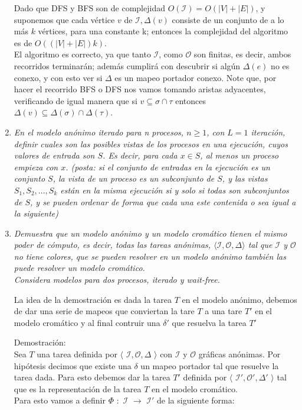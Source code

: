 \documentclass{article}
\begin{document}
\begin{enumerate}
{    Dado que DFS y BFS son de complejidad $O(\mathcal{I}) = O(|V| + |E|)$, y suponemos que cada vértice $v$ de $\mathcal{I},\Delta(v)$
    consiste de un conjunto de a lo más $k$ vértices, para una constante k; entonces la complejidad del algoritmo es de
    $O((|V| + |E|) k)$.\\
    El algoritmo es correcto, ya que tanto $\mathcal{I}$, como $\mathcal{O}$ son finitas, es decir, ambos recorridos terminarán; además
    cumplirá con descubrir si algún $\Delta(e)$ no es conexo, y con esto ver si $\Delta$ es un mapeo portador conexo. Note que, por
    hacer el recorrido BFS o DFS nos vamos tomando aristas adyacentes, verificando de igual manera que si $v\subseteq\sigma\cap\tau$ entonces
    $\Delta(v)\subseteq\Delta(\sigma)\cap\Delta(\tau)$.
  }

\item {
    \textsl{
      En el modelo anónimo iterado para n procesos, $n ≥ 1$, con $L = 1$ iteración, definir
      cuales son las posibles vistas de los procesos en una ejecución, cuyos valores de entrada
      son $S$. Es decir, para cada $x \in S$, al menos un proceso empieza con $x$. (posta: si el
      conjunto de entradas en la ejecución es un conjunto $S$, la vista de un proceso es un 
      subconjunto de $S$, y las vistas $S_1,S_2,...,S_k$ están en la misma ejecución si y solo si
      todas son subconjuntos de $S$, y se pueden ordenar de forma que cada una este contenida o
      sea igual a la siguiente)
    }
  }
  
\item{
    \textsl{
      Demuestra que un modelo anónimo y un modelo cromático tienen el mismo poder de cómputo, es
      decir, todas las tareas anónimas, $\langle \mathcal{I},\mathcal{O},\Delta \rangle$ tal que
      $\mathcal{I}$ y $\mathcal{O}$ no tiene colores, que se pueden resolver en un modelo anónimo
      también las puede resolver un modelo cromático.\\
      Considera modelos para dos procesos, iterado y wait-free.\\
    }

    La idea de la demostración es dada la tarea $T$ en el modelo anónimo, debemos de dar una serie de mapeos
    que conviertan la tare $T$ a una tare $T'$ en el modelo cromático y al final contruir una $\delta'$ que resuelva
    la tarea $T'$

    Demostración:\\
    Sea $T$ una tarea definida por $\langle$ $\mathcal{I},\mathcal{O},\Delta$ $\rangle$ con $\mathcal{I}$
    y $\mathcal{O}$ gráficas anónimas. Por hipótesis decimos que existe una $\delta$ un mapeo portador
    tal que resuelve la tarea dada.
    Para esto debemos dar la tarea $T'$ definida por $\langle$ $\mathcal{I}',\mathcal{O}',\Delta'$ $\rangle$
    tal que es la representación de la tarea $T$ en el modelo cromático.\\
    Para esto vamos a definir $\Phi$ $:$ $\mathcal{I}$ $\xrightarrow{}$ $\mathcal{I}'$ de la siguiente forma:\\

}
\end{enumerate}
\end{document}
